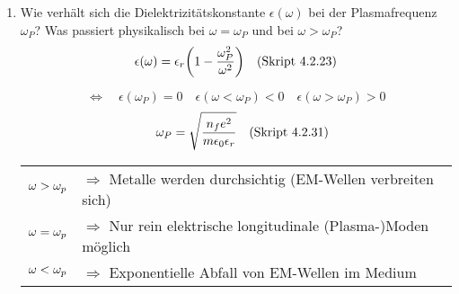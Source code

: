 \begin{enumerate}
  \item Wie verhält sich die Dielektrizitätskonstante $\epsilon(\omega)$ %
        bei der Plasmafrequenz $\omega_P$? Was passiert physikalisch bei
        $\omega=\omega_P$ und bei $\omega>\omega_P$?
        $$
        \epsilon(\omega)=\epsilon_r\qty(1-\frac{\omega_P^2}{\omega^2})
        \quad\text{(Skript 4.2.23)}$$
        \begin{center}
        \end{center}
        $$\Leftrightarrow\quad\epsilon(\omega_P)=0
        \quad\epsilon(\omega<\omega_P)<0 
        \quad\epsilon(\omega>\omega_P)>0$$
        $$\quad\omega_P=\sqrt{\frac{n_fe^2}
        {m\epsilon_0\epsilon_r}}\quad\text{(Skript 4.2.31)}$$
        \begin{tabular}{rl}
          $\displaystyle\omega>\omega_p$ &$\Rightarrow$ 
          Metalle werden durchsichtig (EM-Wellen verbreiten sich)\\
          $\displaystyle\omega=\omega_p$ &$\Rightarrow$ 
          Nur rein elektrische longitudinale (Plasma-)Moden möglich\\
          $\displaystyle\omega<\omega_p$& $\Rightarrow$ Exponentielle 
          Abfall von EM-Wellen im Medium
        \end{tabular}
        \begin{center}
        \end{center}

\end{enumerate}
